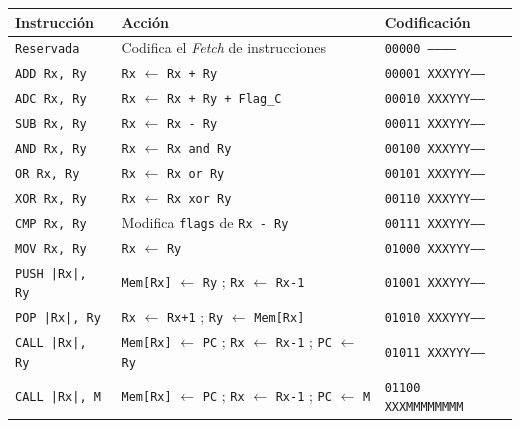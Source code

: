\documentclass[a4paper,11pt]{article}
\begin{document}
\begin{center}
\begin{tabular}{l|l|l}
Instrucción            & Acción                                                             & Codificación               \\
\hline
\texttt{Reservada}     & Codifica el \emph{Fetch} de instrucciones                          & \texttt{00000 -----------} \\  %
\texttt{ADD  Rx, Ry}   & \texttt{Rx} $\leftarrow$ \texttt{Rx + Ry}                          & \texttt{00001 XXXYYY-----} \\  %
\texttt{ADC  Rx, Ry}   & \texttt{Rx} $\leftarrow$ \texttt{Rx + Ry + Flag\_C}                & \texttt{00010 XXXYYY-----} \\  %
\texttt{SUB  Rx, Ry}   & \texttt{Rx} $\leftarrow$ \texttt{Rx - Ry}                          & \texttt{00011 XXXYYY-----} \\  %
\texttt{AND  Rx, Ry}   & \texttt{Rx} $\leftarrow$ \texttt{Rx and Ry}                        & \texttt{00100 XXXYYY-----} \\  %
\texttt{OR   Rx, Ry}   & \texttt{Rx} $\leftarrow$ \texttt{Rx or Ry}                         & \texttt{00101 XXXYYY-----} \\  %
\texttt{XOR  Rx, Ry}   & \texttt{Rx} $\leftarrow$ \texttt{Rx xor Ry}                        & \texttt{00110 XXXYYY-----} \\  %
\texttt{CMP  Rx, Ry}   & Modifica \texttt{flags} de \texttt{Rx - Ry}                        & \texttt{00111 XXXYYY-----} \\  %
\texttt{MOV  Rx, Ry}   & \texttt{Rx} $\leftarrow$ \texttt{Ry}                               & \texttt{01000 XXXYYY-----} \\  %
\hline
\texttt{PUSH |Rx|, Ry} & \texttt{Mem[Rx]} $\leftarrow$ \texttt{Ry} ; \texttt{Rx} $\leftarrow$ \texttt{Rx-1}    & \texttt{01001 XXXYYY-----} \\  %
\texttt{POP  |Rx|, Ry} & \texttt{Rx} $\leftarrow$ \texttt{Rx+1} ; \texttt{Ry} $\leftarrow$ \texttt{Mem[Rx]}    & \texttt{01010 XXXYYY-----} \\  %
\texttt{CALL |Rx|, Ry} & \texttt{Mem[Rx]} $\leftarrow$ \texttt{PC} ; \texttt{Rx} $\leftarrow$ \texttt{Rx-1} ; \texttt{PC} $\leftarrow$ \texttt{Ry}  & \texttt{01011 XXXYYY-----} \\  %
\texttt{CALL |Rx|, M}  & \texttt{Mem[Rx]} $\leftarrow$ \texttt{PC} ; \texttt{Rx} $\leftarrow$ \texttt{Rx-1} ; \texttt{PC} $\leftarrow$ \texttt{M}   & \texttt{01100 XXXMMMMMMMM} \\  %

\end{tabular}
\end{center}
\end{document}
